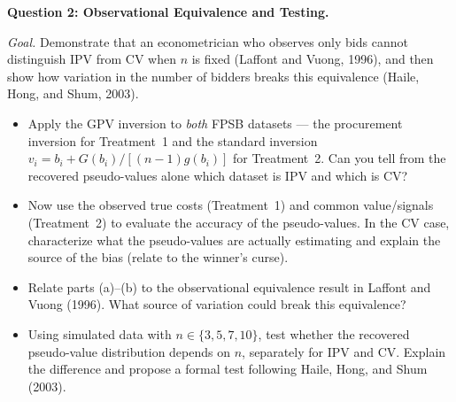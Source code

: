 \documentclass[11pt]{article}
\begin{document}


\vspace{0.3cm}

\noindent\textbf{Question 2: Observational Equivalence and Testing.}

\smallskip

\noindent\textit{Goal.} Demonstrate that an econometrician who observes only bids cannot distinguish IPV from CV when $n$ is fixed (Laffont and Vuong, 1996), and then show how variation in the number of bidders breaks this equivalence (Haile, Hong, and Shum, 2003).

\begin{itemize}[leftmargin=*]

\item[(a)] Apply the GPV inversion to \emph{both} FPSB datasets --- the procurement inversion for Treatment~1 and the standard inversion $v_i = b_i + G(b_i)/[(n-1)g(b_i)]$ for Treatment~2. Can you tell from the recovered pseudo-values alone which dataset is IPV and which is CV?

\item[(b)] Now use the observed true costs (Treatment~1) and common value/signals (Treatment~2) to evaluate the accuracy of the pseudo-values. In the CV case, characterize what the pseudo-values are actually estimating and explain the source of the bias (relate to the winner's curse).

\item[(c)] Relate parts (a)--(b) to the observational equivalence result in Laffont and Vuong (1996). What source of variation could break this equivalence?

\item[(d)] Using simulated data with $n \in \{3, 5, 7, 10\}$, test whether the recovered pseudo-value distribution depends on $n$, separately for IPV and CV. Explain the difference and propose a formal test following Haile, Hong, and Shum (2003).

\end{itemize}



\vspace{0.3cm}
\end{document}
